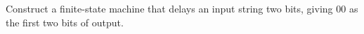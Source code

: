 \documentclass[../main.tex]{subfiles}
\begin{document}
Construct a finite-state machine that delays an input string two bits, giving $00$ as the first two bits of output.

\solution
\end{document}

